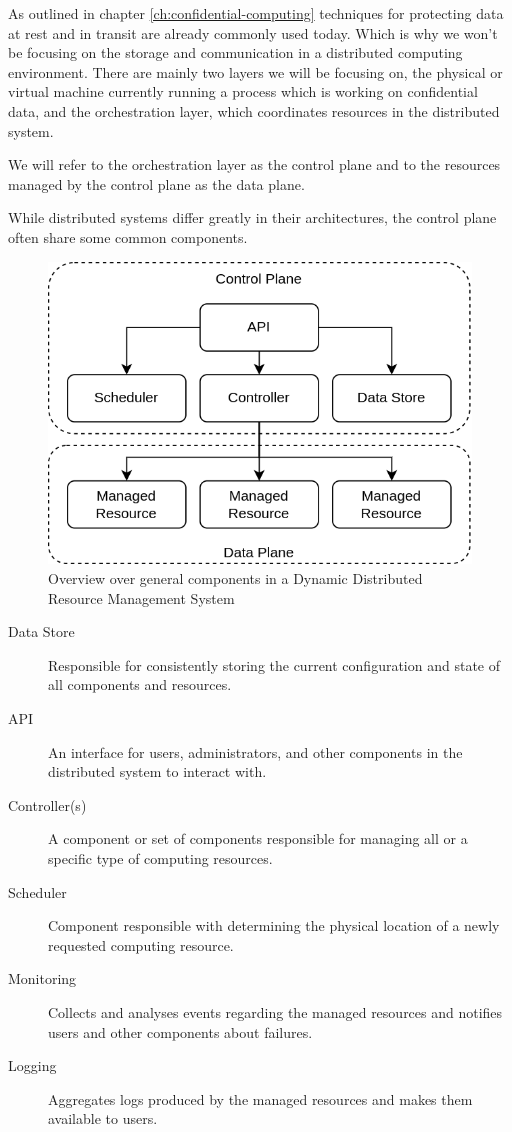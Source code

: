 As outlined in chapter \ref{ch:confidential-computing} techniques for protecting
data at rest and in transit are already commonly used today. Which is why we
won't be focusing on the storage and communication in a distributed computing
environment. There are mainly two layers we will be focusing on, the physical or
virtual machine currently running a process which is working on confidential
data, and the orchestration layer, which coordinates resources in the
distributed system.

We will refer to the orchestration layer as the control plane and to the
resources managed by the control plane as the data plane.

While distributed systems differ greatly in their architectures, the control
plane often share some common components.

\begin{figure}[ht]
  \centering
  \includegraphics[width=0.6\linewidth]{resources/dynamic-distributed-resource-management-overview.png}
  \caption{Overview over general components in a Dynamic Distributed Resource Management System}
  \label{fig:ddrms-overview}
\end{figure}

\begin{description}
  \item[Data Store]
    Responsible for consistently storing the current configuration and state of
    all components and resources.
  \item[API]
    An interface for users, administrators, and other components in the
    distributed system to interact with.
  \item[Controller(s)]
    A component or set of components responsible for managing all or a specific
    type of computing resources.
  \item[Scheduler]
    Component responsible with determining the physical location of a newly
    requested computing resource.
  \item[Monitoring]
    Collects and analyses events regarding the managed resources and notifies
    users and other components about failures.
  \item[Logging]
    Aggregates logs produced by the managed resources and makes them available
    to users.
\end{description}

